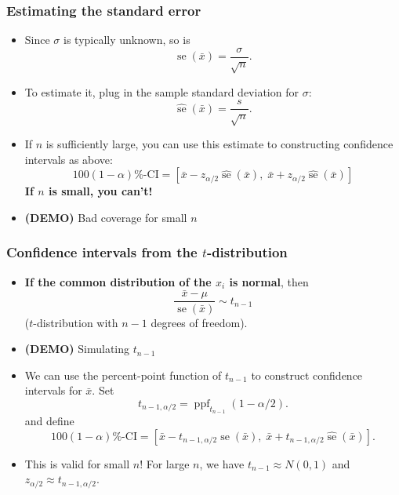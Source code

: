 \documentclass{beamer}
\DeclareMathOperator{\stderr}{se}
\DeclareMathOperator{\PPF}{ppf}
\begin{document}
\begin{frame}
    \frametitle{Estimating the standard error}

    \begin{itemize}
        \item Since $\sigma$ is typically unknown, so is
        \[
            \stderr(\bar{x})=\frac{\sigma}{\sqrt{n}}.
        \]
        \item To estimate it, plug in the sample standard deviation
        for $\sigma$:
        \[
        \widehat{\stderr}(\bar{x}) = \frac{s}{\sqrt{n}}.
        \]
        \item If $n$ is sufficiently large, you can use this estimate to
        constructing confidence intervals as above:
        \[
        \text{$100(1-\alpha)$\%-CI} =
        [\bar{x} - z_{\alpha/2}\widehat{\stderr}(\bar{x}),\;
        \bar{x} + z_{\alpha/2}\widehat{\stderr}(\bar{x})]
        \]
        \textbf{If $n$ is small, you can't!}

        \item \textbf{(DEMO)} Bad coverage for small $n$
    \end{itemize}
\end{frame}

\begin{frame}
    \frametitle{Confidence intervals from the $t$-distribution}

    \begin{itemize}
        \item \textbf{If the common distribution of the $x_i$ is normal}, then
        \[
        \frac{\bar{x}-\mu}{\widehat{\stderr}(\bar{x})}\sim t_{n-1}
        \]
        ($t$-distribution with $n-1$ degrees of freedom).

        \item \textbf{(DEMO)} Simulating $t_{n-1}$
        
        \item We can use the percent-point function of $t_{n-1}$ to
        construct confidence intervals for $\bar{x}$. Set
        \[
        t_{n-1,\alpha/2} = \PPF_{t_{n-1}}(1 - \alpha/2).
        \]
        and define
        \[
        \text{$100(1-\alpha)$\%-CI} = 
        [\bar{x} - t_{n-1,\alpha/2}\widehat{\stderr}(\bar{x}),\;
        \bar{x} + t_{n-1,\alpha/2}\widehat{\stderr}(\bar{x})].
        \]

        \item This is valid for small $n$!
        For large $n$, we have $t_{n-1}\approx N(0, 1)$ and $z_{\alpha/2}\approx t_{n-1, \alpha/2}$.
    \end{itemize}
    
\end{frame}
\end{document}

